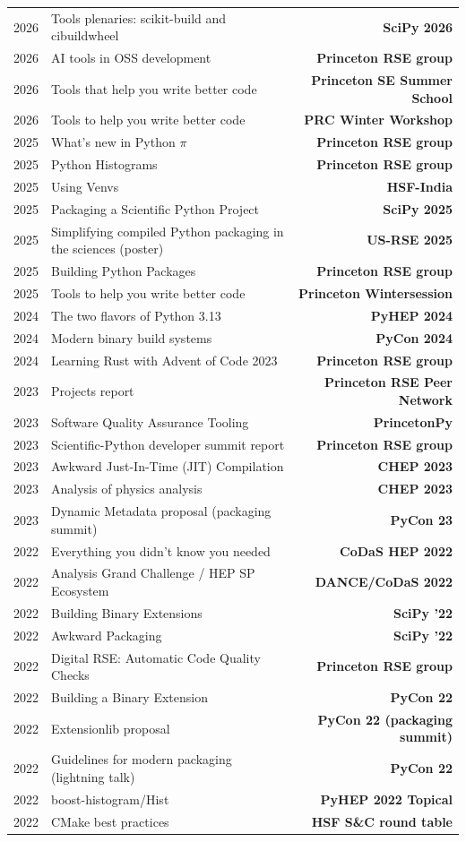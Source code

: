 \documentclass[10pt,letterpaper]{moderncv}
\begin{document}
\begin{tabularx}{\textwidth}{p{.33in}>{\raggedright\arraybackslash}X>{\bfseries}r}
    2026 & Tools plenaries: scikit-build and cibuildwheel & SciPy 2026 \\
    2026 & AI tools in OSS development & Princeton RSE group \\
    2026 & Tools that help you write better code & Princeton SE Summer School \\
    2026 & Tools to help you write better code & PRC Winter Workshop \\
    2025 & What's new in Python $\pi$ & Princeton RSE group \\
    2025 & Python Histograms & Princeton RSE group \\
    2025 & Using Venvs & HSF-India \\
    2025 & Packaging a Scientific Python Project & SciPy 2025 \\
    2025 & Simplifying compiled Python packaging in the sciences (poster) & US-RSE 2025 \\
    2025 & Building Python Packages & Princeton RSE group \\
    2025 & Tools to help you write better code & Princeton Wintersession \\
    2024 & The two flavors of Python 3.13 & PyHEP 2024 \\
    2024 & Modern binary build systems & PyCon 2024 \\
    2024 & Learning Rust with Advent of Code 2023 & Princeton RSE group \\
    2023 & Projects report & Princeton RSE Peer Network \\
    2023 & Software Quality Assurance Tooling & PrincetonPy \\
    2023 & Scientific-Python developer summit report & Princeton RSE group \\
    2023 & Awkward Just-In-Time (JIT) Compilation & CHEP 2023 \\
    2023 & Analysis of physics analysis & CHEP 2023 \\
    2023 & Dynamic Metadata proposal (packaging summit) & PyCon 23 \\
    2022 & Everything you didn't know you needed & CoDaS HEP 2022 \\
    2022 & Analysis Grand Challenge / HEP SP Ecosystem & DANCE/CoDaS 2022 \\
    2022 & Building Binary Extensions & SciPy '22 \\
    2022 & Awkward Packaging & SciPy '22 \\
    2022 & Digital RSE: Automatic Code Quality Checks & Princeton RSE group \\
    2022 & Building a Binary Extension & PyCon 22 \\
    2022 & Extensionlib proposal & PyCon 22 (packaging summit) \\
    2022 & Guidelines for modern packaging (lightning talk) & PyCon 22 \\
    2022 & boost-histogram/Hist & PyHEP 2022 Topical \\
    2022 & CMake best practices & HSF S\&C round table \\
\end{tabularx}
\end{document}
